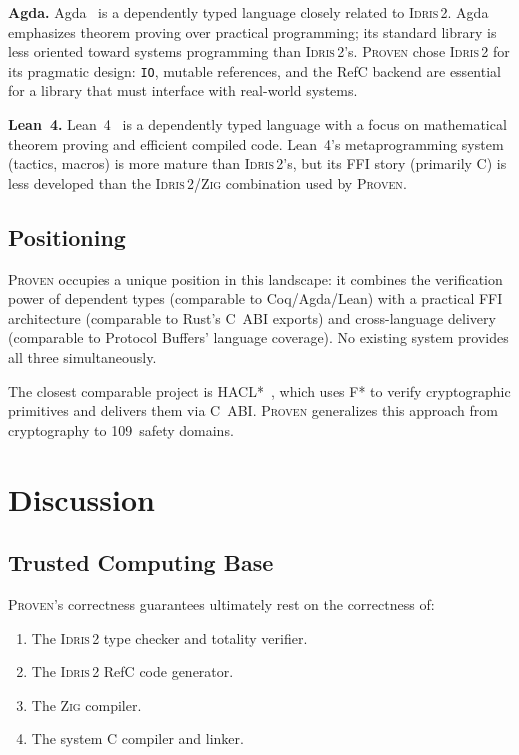 \documentclass[11pt,a4paper]{article}
\newcommand{\proven}{\textsc{Proven}}
\newcommand{\idris}{\textsc{Idris\,2}}
\newcommand{\zig}{\textsc{Zig}}
\newcommand{\code}[1]{\texttt{#1}}
\begin{document}
\textbf{Agda.} Agda~\cite{norell2008agda} is a dependently typed language
closely related to \idris{}. Agda emphasizes theorem proving over
practical programming; its standard library is less oriented toward
systems programming than \idris{}'s. \proven{} chose \idris{} for its
pragmatic design: \code{IO}, mutable references, and the RefC backend
are essential for a library that must interface with real-world systems.

\textbf{Lean~4.} Lean~4~\cite{demoura2021lean4} is a dependently typed
language with a focus on mathematical theorem proving and efficient
compiled code. Lean~4's metaprogramming system (tactics, macros) is
more mature than \idris{}'s, but its FFI story (primarily C) is less
developed than the \idris{}/\zig{} combination used by \proven{}.

\subsection{Positioning}

\proven{} occupies a unique position in this landscape: it combines the
verification power of dependent types (comparable to Coq/Agda/Lean) with
a practical FFI architecture (comparable to Rust's C~ABI exports) and
cross-language delivery (comparable to Protocol Buffers' language
coverage). No existing system provides all three simultaneously.

The closest comparable project is HACL*~\cite{zinzindohoue2017hacl},
which uses F* to verify cryptographic primitives and delivers them via
C~ABI. \proven{} generalizes this approach from cryptography to
109~safety domains.


\section{Discussion}
\label{sec:discussion}

\subsection{Trusted Computing Base}

\proven{}'s correctness guarantees ultimately rest on the correctness of:

\begin{enumerate}[nosep]
  \item The \idris{} type checker and totality verifier.
  \item The \idris{} RefC code generator.
  \item The \zig{} compiler.
  \item The system C compiler and linker.
\end{enumerate}
\end{document}
